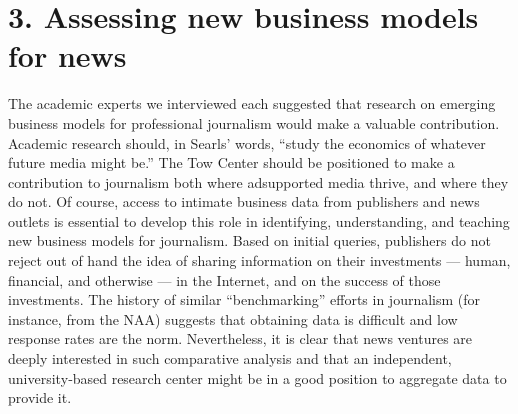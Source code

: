 \section{3. Assessing new business models for news}
The academic experts we interviewed each suggested that research on
emerging business models for professional journalism would make a
valuable contribution. Academic research should, in Searls’ words, ``study
the economics of whatever future media might be.'' The Tow Center
should be positioned to make a contribution to journalism both where adsupported
media thrive, and where they do not.
Of course, access to intimate business data from publishers and news
outlets is essential to develop this role in identifying, understanding, and
teaching new business models for journalism. Based on initial queries,
publishers do not reject out of hand the idea of sharing information on
their investments — human, financial, and otherwise — in the Internet,
and on the success of those investments. The history of similar
``benchmarking'' efforts in journalism (for instance, from the NAA)
suggests that obtaining data is difficult and low response rates are the
norm. Nevertheless, it is clear that news ventures are deeply interested in
such comparative analysis and that an independent, university‐based
research center might be in a good position to aggregate data to provide it.

